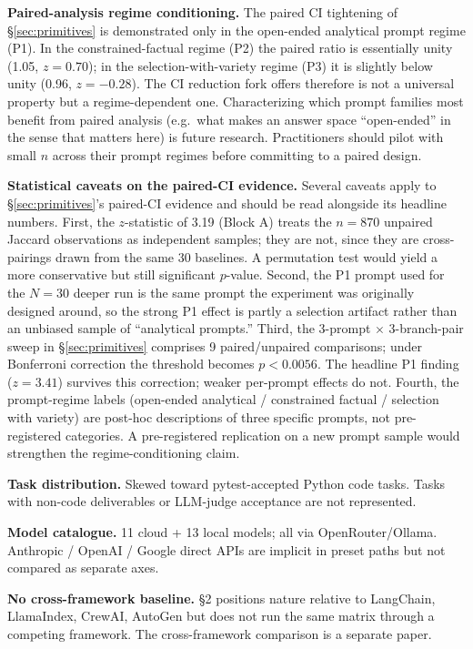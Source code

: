\documentclass[11pt,a4paper]{article}
\begin{document}
\textbf{Paired-analysis regime conditioning.} The paired CI
tightening of \S\ref{sec:primitives} is demonstrated only in
the open-ended analytical prompt regime (P1). In the
constrained-factual regime (P2) the paired ratio is
essentially unity (1.05, $z=0.70$); in the
selection-with-variety regime (P3) it is slightly below
unity (0.96, $z=-0.28$). The CI reduction fork offers
therefore is not a universal property but a regime-dependent
one. Characterizing which prompt families most benefit from
paired analysis (e.g.\ what makes an answer space
``open-ended'' in the sense that matters here) is future
research. Practitioners should pilot with small $n$ across
their prompt regimes before committing to a paired design.

\textbf{Statistical caveats on the paired-CI evidence.}
Several caveats apply to \S\ref{sec:primitives}'s paired-CI
evidence and should be read alongside its headline numbers.
First, the $z$-statistic of 3.19 (Block A) treats the
$n=870$ unpaired Jaccard observations as independent samples;
they are not, since they are cross-pairings drawn from the
same 30 baselines. A permutation test would yield a more
conservative but still significant $p$-value. Second, the
P1 prompt used for the $N=30$ deeper run is the same prompt
the experiment was originally designed around, so the strong
P1 effect is partly a selection artifact rather than an
unbiased sample of ``analytical prompts.'' Third, the
3-prompt $\times$ 3-branch-pair sweep in
\S\ref{sec:primitives} comprises 9 paired/unpaired
comparisons; under Bonferroni correction the threshold
becomes $p<0.0056$. The headline P1 finding ($z=3.41$)
survives this correction; weaker per-prompt effects do not.
Fourth, the prompt-regime labels (open-ended analytical /
constrained factual / selection with variety) are post-hoc
descriptions of three specific prompts, not pre-registered
categories. A pre-registered replication on a new prompt
sample would strengthen the regime-conditioning claim.

\textbf{Task distribution.} Skewed toward
pytest-accepted Python code tasks. Tasks with non-code
deliverables or LLM-judge acceptance are not represented.

\textbf{Model catalogue.} 11 cloud + 13 local models; all via
OpenRouter/Ollama. Anthropic / OpenAI / Google direct APIs are
implicit in preset paths but not compared as separate axes.

\textbf{No cross-framework baseline.} \S2 positions nature
relative to LangChain, LlamaIndex, CrewAI, AutoGen but does
not run the same matrix through a competing framework. The
cross-framework comparison is a separate paper.
\end{document}
